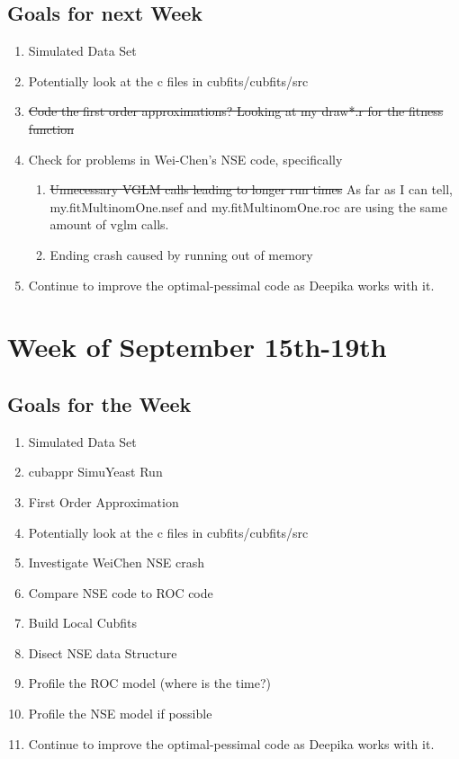 \subsection{Goals for next Week}
\begin{enumerate}
\item Simulated Data Set
\item Potentially look at the c files in cubfits/cubfits/src
\item \sout{Code the first order approximations? Looking at my draw*.r for the fitness function}
\item Check for problems in Wei-Chen's NSE code, specifically
\begin{enumerate}
\item \sout{Unnecessary VGLM calls leading to longer run times} As far as I can tell, my.fitMultinomOne.nsef and my.fitMultinomOne.roc are using the same amount of vglm calls.
\item Ending crash caused by running out of memory
\end{enumerate}

\item Continue to improve the optimal-pessimal code as Deepika works with it.
\end{enumerate}


\section{Week of September 15th-19th}
\subsection{Goals for the Week}
\begin{enumerate}
\item Simulated Data Set
\item cubappr SimuYeast Run
\item First Order Approximation
\item Potentially look at the c files in cubfits/cubfits/src
\item Investigate WeiChen NSE crash
\item Compare NSE code to ROC code
\item Build Local Cubfits
\item Disect NSE data Structure
\item Profile the ROC model (where is the time?)
\item Profile the NSE model if possible
\item Continue to improve the optimal-pessimal code as Deepika works with it.
\end{enumerate}

